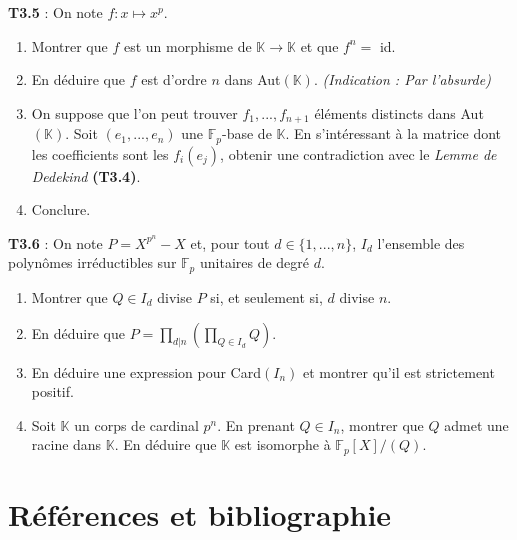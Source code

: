 \documentclass[5pt,a4paper]{article}
\begin{document}
\begin{onehalfspacing}
\textbf{T3.5} : On note $f : x \mapsto x^p$.
\begin{enumerate}
	\item Montrer que $f$ est un morphisme de $\mathbb{K} \rightarrow \mathbb{K}$ et que $f^n =$ id. 
	\item En déduire que $f$ est d'ordre $n$ dans Aut$(\mathbb{K})$. \textit{(Indication : Par l'absurde)}
	\item On suppose que l'on peut trouver $f_1, ..., f_{n+1}$ éléments distincts dans Aut$(\mathbb{K})$. Soit $(e_1, ..., e_n)$ une $\mathbb{F}_p$-base de $\mathbb{K}$. En s'intéressant à la matrice dont les coefficients sont les $f_i(e_j)$, obtenir une contradiction avec le \textit{Lemme de Dedekind} \textbf{(T3.4)}.
	\item Conclure.
\end{enumerate}

\textbf{T3.6} : On note $P = X^{p^n} - X$ et, pour tout $d \in \{1, ..., n\}$, $I_d$ l'ensemble des polynômes irréductibles sur $\mathbb{F}_p$ unitaires de degré $d$.
\begin{enumerate}
	\item Montrer que $Q \in I_d$ divise $P$ si, et seulement si, $d$ divise $n$.
	\item En déduire que $P = \prod_{d | n} (\prod_{Q \in I_d} Q)$.
	\item En déduire une expression pour Card$(I_n)$ et montrer qu'il est strictement positif.
	\item Soit $\mathbb{K}$ un corps de cardinal $p^n$. En prenant $Q \in I_n$, montrer que $Q$ admet une racine dans $\mathbb{K}$. En déduire que $\mathbb{K}$ est isomorphe à $\mathbb{F}_p[X]/(Q)$.
\end{enumerate}

\newpage
\section{Références et bibliographie}\label{sec:refs}


\end{onehalfspacing}
\end{document}
